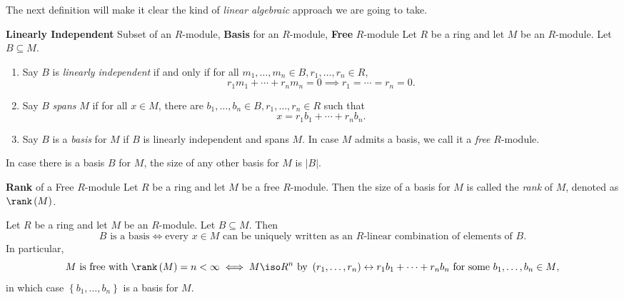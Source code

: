 \documentclass[pmath441]{subfiles}
\begin{document}
    The next definition will make it clear the kind of \textit{linear algebraic} approach we are going to take.

    \begin{definition}{\textbf{Linearly Independent} Subset of an $R$-module, \textbf{Basis} for an $R$-module, \textbf{Free} $R$-module}
        Let $R$ be a ring and let $M$ be an $R$-module. Let $B\subseteq M$.
        \begin{enumerate}
            \item Say $B$ is \emph{linearly independent} if and only if for all $m_1,\ldots,m_n\in B, r_1,\ldots,r_n\in R$,
                \begin{equation*}
                    r_1m_1 + \cdots + r_nm_n = 0 \implies r_1 = \cdots = r_n = 0.
                \end{equation*}
            \item Say $B$ \emph{spans} $M$ if for all $x\in M$, there are $b_1,\ldots,b_n\in B, r_1,\ldots,r_n\in R$ such that
                \begin{equation*}
                    x = r_1b_1 + \cdots + r_nb_n.
                \end{equation*}
            \item Say $B$ is a \emph{basis} for $M$ if $B$ is linearly independent and spans $M$. In case $M$ admits a basis, we call it a \emph{free} $R$-module.
        \end{enumerate}
    \end{definition}

    \np In case there is a basis $B$ for $M$, the size of any other basis for $M$ is $\left| B \right|$.

    \begin{definition}{\textbf{Rank} of a Free $R$-module}
        Let $R$ be a ring and let $M$ be a free $R$-module. Then the size of a basis for $M$ is called the \emph{rank} of $M$, denoted as $\rank\left( M \right)$.
    \end{definition}
    
    \begin{prop}{}
        Let $R$ be a ring and let $M$ be an $R$-module. Let $B\subseteq M$. Then
        \begin{equation*}
            \text{$B$ is a basis} \iff \text{every $x\in M$ can be uniquely written as an $R$-linear combination of elements of $B$}.
        \end{equation*}
        In particular,
        \begin{equation*}
            \text{$M$ is free with }\rank\left( M \right) = n < \infty \iff M\iso R^n \text{ by } \left( r_1,\ldots,r_n \right)\leftrightarrow r_1b_1+\cdots+r_nb_n \text{ for some $b_1,\ldots,b_n\in M$},
        \end{equation*}
        in which case $\left\lbrace b_1,\ldots,b_n \right\rbrace$ is a basis for $M$.
    \end{prop}
\end{document}
